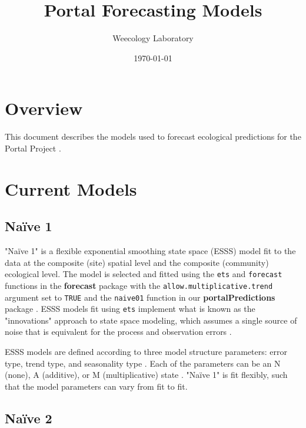 \documentclass{article}
\title{Portal Forecasting Models}
\author[1]{Weecology Laboratory}
\affil[1]{University of Florida}
\date{\today}
\def\code#1{\texttt{#1}}
\begin{document}
\maketitle
\tableofcontents

\section*{Overview}
\label{sec:overview}

This document describes the models used to forecast ecological predictions for the Portal Project \citep{Brown1998, PortalPredictions}. 

\section{Current Models}
\label{sec:currmods}

\subsection{Na\"{i}ve 1}
\label{subsec:currmods_naive01}

"Na\"{i}ve 1" is a flexible exponential smoothing state space (ESSS) model \citep{Hyndman2008} fit to the data at the composite (site) spatial level and the composite (community) ecological level. The model is selected and fitted using the \code{ets} and \code{forecast} functions in the \textbf{forecast} package \citep{Hyndman2017} with the \code{allow.multiplicative.trend} argument set to \code{TRUE} and the \code{naive01} function in our \textbf{portalPredictions} package \citep{PortalPredictions}. ESSS models fit using \code{ets} implement what is known as the "innovations" approach to state space modeling, which assumes a single source of noise that is equivalent for the process and observation errors \citep{Hyndman2008}.

ESSS models are defined according to three model structure parameters: error type, trend type, and seasonality type \citep{Hyndman2008}. Each of the parameters can be an N (none), A (additive), or M (multiplicative) state \citep{Hyndman2008}. "Na\"{i}ve 1" is fit flexibly, such that the model parameters can vary from fit to fit.

\subsection{Na\"{i}ve 2}
\label{subsec:currmods_naive02}
\end{document}

